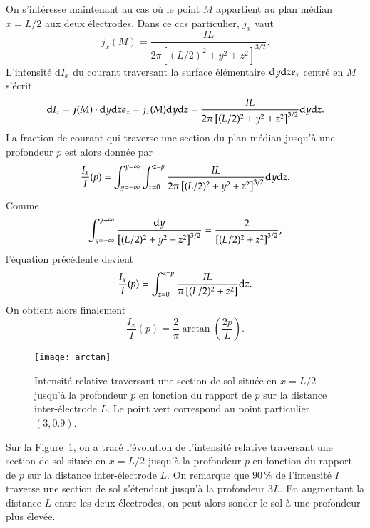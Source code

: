 On s'intéresse maintenant au cas où le point $M$ appartient au plan médian $
x = L/2$ aux
deux électrodes. Dans ce cas particulier, $j_x$ vaut
\begin{equation*}
	j_x(M) = \dfrac{IL}{2 \pi \left[(L/2)^2 + y^2 + z^2\right]^{3/2}}.
\end{equation*}
L'intensité $\mathrm{d}I_x$ du courant traversant la surface 
élémentaire $\dy\dz \ex$ centré en $M$ s'écrit
\begin{equation*}
	\mathrm{d}I_x = \vecj(M) \cdot \dy\dz\ex = j_x(M) \dy\dz
	    = \dfrac{IL}{2 \pi \left[(L/2)^2 + y^2 + z^2\right]^{3/2}} \dy\dz.
\end{equation*}
La fraction de courant qui traverse une section du plan médian jusqu'à une 
profondeur $p$ est alors donnée par
\begin{equation*}
	\dfrac{I_x}{I}(p) = \int_{y=-\infty}^{y=\infty} \int_{z=0}^{z=p}
	\dfrac{IL}{2 \pi \left[(L/2)^2 + y^2 + z^2\right]^{3/2}} \mathrm{d}y\mathrm{d}z.
\end{equation*}
Comme 
	\begin{equation*}
		\int_{y=-\infty}^{y=\infty} \dfrac{\mathrm{d}y}{
			\left[(L/2)^2 + y^2 + z^2\right]^{3/2}} = 
		\dfrac{2}{\left[(L/2)^2 + z^2\right]^{3/2}},
	\end{equation*}
l'équation précédente devient
\begin{equation*}
	\dfrac{I_x}{I}(p) = \int_{z=0}^{z=p}
	\dfrac{IL}{\pi \left[(L/2)^2 + z^2\right]} \mathrm{d}z.
\end{equation*}
On obtient alors finalement
\begin{equation}
	\dfrac{I_x}{I}(p) = \dfrac{2}{\pi}\arctan\left(\dfrac{2p}{L}\right).
\end{equation}

\begin{figure}[]
	\centering
	\texttt{[image: arctan]}
	\caption{Intensité relative traversant une section de sol située 
		en $x = L/2$ jusqu'à la profondeur
	$p$ en fonction du rapport de $p$ sur la distance inter-électrode $L$.
	Le point vert correspond au point particulier $(3, 0.9)$.}%
	\label{fig:arctan}
\end{figure}
Sur la Figure~\ref{fig:arctan}, on a tracé l'évolution de l'intensité relative traversant
une section de sol située en $x = L/2$ 
jusqu'à la profondeur $p$ en fonction du rapport de $p$ sur 
la distance inter-électrode $L$. 
On remarque que $90\,\%$ de l'intensité $I$ traverse une section de sol s'étendant
jusqu'à la profondeur $3L$. En augmentant la distance $L$ entre les deux électrodes,
on peut alors sonder le sol à une profondeur plus élevée.

